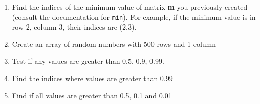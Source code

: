 \documentclass[a4paper]{article}
\begin{document}
	\begin{enumerate}
		\item  Find the indices of the minimum value of matrix \textbf{m} you previously created (consult the documentation for \texttt{min}).
		For example, if the minimum value is in row 2, column 3, their indices are (2,3).
		
		\item Create an array of random numbers with 500 rows and 1 column
		\item Test if any values are greater than 0.5, 0.9, 0.99.
		\item Find the indices where values are greater than 0.99
		\item Find if all values are greater than 0.5, 0.1 and 0.01
	\end{enumerate}
\end{document}
